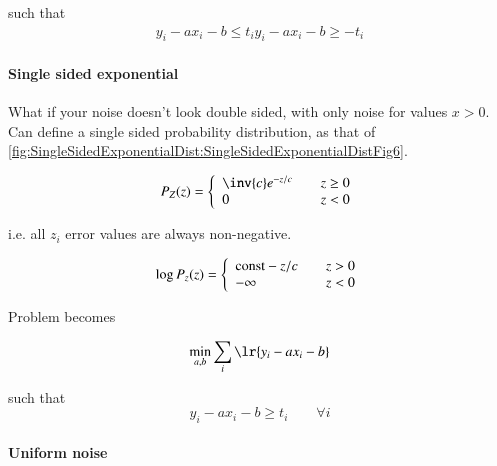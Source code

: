 such that
\begin{dmath}\label{eqn:L1introduction:580}
\begin{aligned}
y_i - a x_i - b \le t_i
y_i - a x_i - b \ge -t_i
\end{aligned}
\end{dmath}

\paragraph{Single sided exponential}

What if your noise doesn't look double sided, with only noise for values \( x > 0 \).  Can define a single sided probability distribution, as that of \cref{fig:SingleSidedExponentialDist:SingleSidedExponentialDistFig6}.


\begin{dmath}\label{eqn:L1introduction:600}
P_Z(z) =
\left\{
\begin{array}{l l}
\inv{c} e^{-z/c} & \quad \mbox{\( z \ge 0 \)} \\
0 & \quad \mbox{\( z < 0 \)}
\end{array}
\right.
\end{dmath}

i.e. all \( z_i \) error values are always non-negative.

\begin{dmath}\label{eqn:L1introduction:620}
\log P_z(z) =
\left\{
\begin{array}{l l}
\textrm{const} - z/c & \quad \mbox{\( z > 0\)} \\
-\infty & \quad \mbox{\( z< 0\)}
\end{array}
\right.
\end{dmath}

Problem becomes

\begin{dmath}\label{eqn:L1introduction:640}
\min_{a, b} \sum_i \lr{ y_i - a x_i - b }
\end{dmath}

such that
\begin{equation}\label{eqn:L1introduction:660}
y_i - a x_i - b \ge t_i \qquad \forall i
\end{equation}

\paragraph{Uniform noise}

